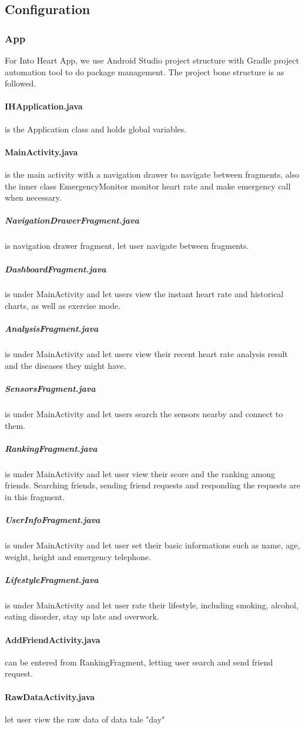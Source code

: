 \documentclass[10pt,a4paper,final]{scrartcl}
\begin{document}
\subsection{Configuration}
\subsubsection{App}
For Into Heart App, we use Android Studio project structure with Gradle project automation tool to do package management. The project bone structure is as followed.

\paragraph{IHApplication.java} is the Application class and holds global variables.
\paragraph{MainActivity.java} is the main activity with a navigation drawer to navigate between fragments, also the inner class EmergencyMonitor monitor heart rate and make emergency call when necessary.
\subparagraph{NavigationDrawerFragment.java} is navigation drawer fragment, let user navigate between fragments.
\subparagraph{DashboardFragment.java} is under MainActivity and let users view the instant heart rate and historical charts, as well as exercise mode.
\subparagraph{AnalysisFragment.java} is under MainActivity and let users view their recent heart rate analysis result  and the diseases they might have.
\subparagraph{SensorsFragment.java} is under MainActivity and let users search the sensors nearby and connect to them.
\subparagraph{RankingFragment.java} is under MainActivity and let user view their score and the ranking among friends. Searching friends, sending friend requests and responding the requests are in this fragment.
\subparagraph{UserInfoFragment.java} is under MainActivity and let user set their basic informations such as name, age, weight, height and emergency telephone.
\subparagraph{LifestyleFragment.java} is under MainActivity and let user rate their lifestyle, including smoking, alcohol, eating disorder, stay up late and overwork.
\paragraph{AddFriendActivity.java} can be entered from RankingFragment, letting user search and send friend request.
\paragraph{RawDataActivity.java} let user view the raw data of data tale "day"
\end{document}

